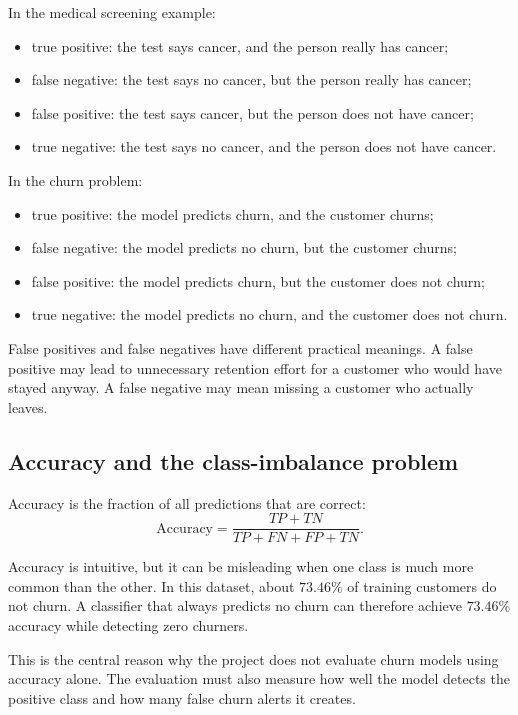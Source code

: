 In the medical screening example:
\begin{itemize}
    \item true positive: the test says cancer, and the person really has cancer;
    \item false negative: the test says no cancer, but the person really has cancer;
    \item false positive: the test says cancer, but the person does not have cancer;
    \item true negative: the test says no cancer, and the person does not have cancer.
\end{itemize}

In the churn problem:
\begin{itemize}
    \item true positive: the model predicts churn, and the customer churns;
    \item false negative: the model predicts no churn, but the customer churns;
    \item false positive: the model predicts churn, but the customer does not churn;
    \item true negative: the model predicts no churn, and the customer does not churn.
\end{itemize}

False positives and false negatives have different practical meanings. A false positive may lead to unnecessary retention effort for a customer who would have stayed anyway. A false negative may mean missing a customer who actually leaves.

\subsection{Accuracy and the class-imbalance problem}

Accuracy is the fraction of all predictions that are correct:
\[
\text{Accuracy}
=
\frac{TP + TN}{TP + FN + FP + TN}.
\]

Accuracy is intuitive, but it can be misleading when one class is much more common than the other. In this dataset, about \(73.46\%\) of training customers do not churn. A classifier that always predicts no churn can therefore achieve \(73.46\%\) accuracy while detecting zero churners.

This is the central reason why the project does not evaluate churn models using accuracy alone. The evaluation must also measure how well the model detects the positive class and how many false churn alerts it creates.


